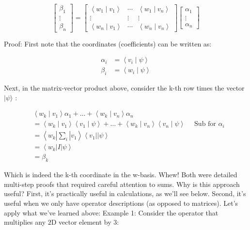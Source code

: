 \documentclass[main.tex]{subfiles}
\begin{document}
    $$
    \left[\begin{array}{r}
    \beta_{1} \\
    \vdots \\
    \beta_{n}
    \end{array}\right]=\left[\begin{array}{ccc}
    \left\langle w_{1} \mid v_{1}\right\rangle & \cdots & \left\langle w_{1} \mid v_{n}\right\rangle \\
    \vdots & \vdots & \vdots \\
    \left\langle w_{n} \mid v_{1}\right\rangle & \cdots & \left\langle w_{n} \mid v_{n}\right\rangle
    \end{array}\right]\left[\begin{array}{r}
    \alpha_{1} \\
    \vdots \\
    \alpha_{n}
    \end{array}\right]
    $$
    
    Proof: First note that the coordinates (coefficients) can be written as:
    
    $$
    \begin{aligned}
    \alpha_{i} &=\left\langle v_{i} \mid \psi\right\rangle \\
    \beta_{i} &=\left\langle w_{i} \mid \psi\right\rangle
    \end{aligned}
    $$
    
    Next, in the matrix-vector product above, consider the k-th row times the vector $|\psi\rangle$ : 
    
    $$
    \begin{aligned}
    &\left\langle w_{k} \mid v_{1}\right\rangle \alpha_{1}+\ldots+\left\langle w_{k} \mid v_{n}\right\rangle \alpha_{n}\\
    &=\left\langle w_{k} \mid v_{1}\right\rangle\left\langle v_{1} \mid \psi\right\rangle+\ldots+\left\langle w_{k} \mid v_{n}\right\rangle\left\langle v_{n} \mid \psi\right\rangle \quad \text { Sub for } \alpha_{i}\\
    &=\left\langle w_{k}\left|\sum_{i}\right| v_{1}\right\rangle\left\langle v_{1}|| \psi\right\rangle\\
    &=\left\langle w_{k}|I| \psi\right\rangle\\
    &=\beta_{k}
    \end{aligned}
    $$
    
    Which is indeed the k-th coordinate in the w-basis. Whew! Both were detailed multi-step proofs that required careful attention to sums. Why is this approach useful? First, it's practically useful in calculations, as we'll see below. Second, it's useful when we only have operator descriptions (as opposed to matrices). Let's apply what we've learned above: Example 1: Consider the operator that multiplies any $2 \mathrm{D}$ vector element by $3:$
    
\end{document}
